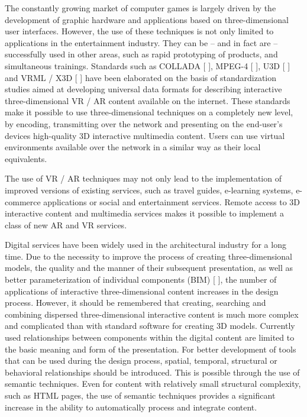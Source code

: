 \documentclass[runningheads]{llncs}
\begin{document}
The constantly growing market of computer games is largely driven by the development of graphic hardware and applications based on three-dimensional user interfaces. However, the use of these techniques is not only limited to applications in the entertainment industry. They can be – and in fact are – successfully used in other areas, such as rapid prototyping of products, and simultaneous trainings. Standards such as COLLADA [ ], MPEG-4 [ ], U3D [ ] and VRML / X3D [ ] have been elaborated on the basis of standardization studies aimed at developing universal data formats for describing interactive three-dimensional VR / AR content available on the internet. These standards make it possible to use three-dimensional techniques on a completely new level, by encoding, transmitting over the network and presenting on the end-user's devices high-quality 3D interactive multimedia content. Users can use virtual environments available over the network in a similar way as their local equivalents.

The use of VR / AR techniques may not only lead to the implementation of improved versions of existing services, such as travel guides, e-learning systems, e-commerce applications or social and entertainment services. Remote access to 3D interactive content and multimedia services makes it possible to implement a class of new AR and VR services.

Digital services have been widely used in the architectural industry for a long time. Due to the necessity to improve the process of creating three-dimensional models, the quality and the manner of their subsequent presentation, as well as better parameterization of individual components (BIM) [ ], the number of applications of interactive three-dimensional content increases in the design process. However, it should be remembered that creating, searching and combining dispersed three-dimensional interactive content is much more complex and complicated than with standard software for creating 3D models. Currently used relationships between components within the digital content are limited to the basic meaning and form of the presentation. For better development of tools that can be used during the design process, spatial, temporal, structural or behavioral relationships should be introduced. This is possible through the use of semantic techniques. Even for content with relatively small structural complexity, such as HTML pages, the use of semantic techniques provides a significant increase in the ability to automatically process and integrate content.
\end{document}
